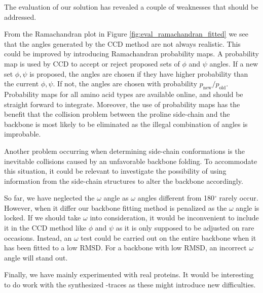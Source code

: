 The evaluation of our solution has revealed a couple of weaknesses that should be addressed. 

From the Ramachandran plot in Figure \ref{fig:eval_ramachandran_fitted} we see that the angles generated by the CCD method are not always realistic.
This could be improved by introducing Ramachandran probability maps.
A probability map is used by CCD to accept or reject proposed sets of $\phi$ and $\psi$ angles.
If a new set $\phi,\psi$ is proposed, the angles are chosen if they have higher probability than the current $\phi,\psi$.
If not, the angles are chosen with probability $p_{\text{new}}/p_{\text{old}}$. 
Probability maps for all amino acid types are available online, \cite{10.1371/journal.pcbi.1000763} and should be straight forward to integrate.
Moreover, the use of probability maps has the benefit that the collision problem between the proline side-chain and the backbone is most likely to be eliminated as the illegal combination of angles is improbable. 

Another problem occurring when determining side-chain conformations is the inevitable collisions caused by an unfavorable backbone folding. 
To accommodate this situation, it could be relevant to investigate the possibility of using information from the side-chain structures to alter the backbone accordingly. 

So far, we have neglected the $\omega$ angle as $\omega$ angles different from 180$^\circ$ rarely occur. 
However, when it differ our backbone fitting method is penalized as the $\omega$ angle is locked.
If we should take $\omega$ into consideration, it would be inconvenient to include it in the CCD method like $\phi$ and $\psi$ as it is only supposed to be adjusted on rare occasions.
Instead, an $\omega$ test could be carried out on the entire backbone when it has been fitted to a low RMSD.
For a backbone with low RMSD, an incorrect $\omega$ angle will stand out.

Finally, we have mainly experimented with real proteins. 
It would be interesting to do work with the synthesized \Ca-traces as these might introduce new difficulties.




